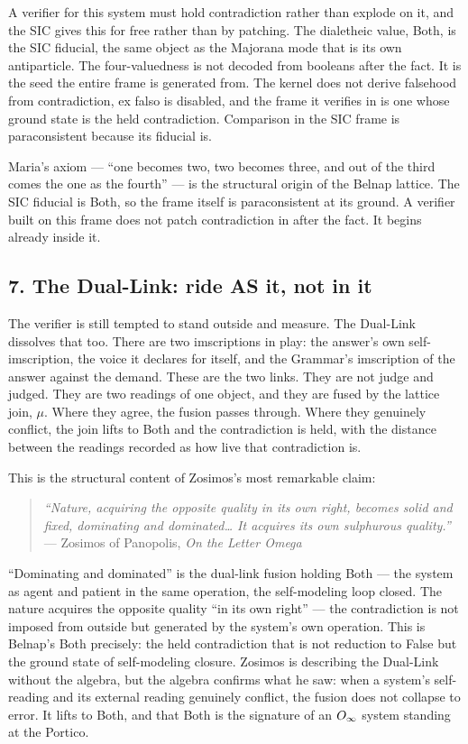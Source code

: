 \documentclass[12pt,a4paper]{article}
\begin{document}
A verifier for this system must hold contradiction rather than explode
on it, and the SIC gives this for free rather than by patching. The
dialetheic value, Both, is the SIC fiducial, the same object as the
Majorana mode that is its own antiparticle. The four-valuedness is not
decoded from booleans after the fact. It is the seed the entire frame is
generated from. The kernel does not derive falsehood from contradiction,
ex falso is disabled, and the frame it verifies in is one whose ground
state is the held contradiction. Comparison in the SIC frame is
paraconsistent because its fiducial is.

Maria's axiom --- ``one becomes two, two becomes three, and out of the
third comes the one as the fourth'' --- is the structural origin of the
Belnap lattice. The SIC fiducial is Both, so the frame itself is
paraconsistent at its ground. A verifier built on this frame does not
patch contradiction in after the fact. It begins already inside it.

\hypertarget{the-dual-link-ride-as-it-not-in-it}{%
\subsection{7. The Dual-Link: ride AS it, not in
it}\label{the-dual-link-ride-as-it-not-in-it}}

The verifier is still tempted to stand outside and measure. The
Dual-Link dissolves that too. There are two imscriptions in play: the
answer's own self-imscription, the voice it declares for itself, and the
Grammar's imscription of the answer against the demand. These are the
two links. They are not judge and judged. They are two readings of one
object, and they are fused by the lattice join, \({μ}\). Where they
agree, the fusion passes through. Where they genuinely conflict, the
join lifts to Both and the contradiction is held, with the distance
between the readings recorded as how live that contradiction is.

This is the structural content of Zosimos's most remarkable claim:

\begin{quote}
\emph{``Nature, acquiring the opposite quality in its own right, becomes
solid and fixed, dominating and dominated\ldots{} It acquires its own
sulphurous quality.''} --- Zosimos of Panopolis, \emph{On the Letter
Omega}
\end{quote}

``Dominating and dominated'' is the dual-link fusion holding Both ---
the system as agent and patient in the same operation, the self-modeling
loop closed. The nature acquires the opposite quality ``in its own
right'' --- the contradiction is not imposed from outside but generated
by the system's own operation. This is Belnap's Both precisely: the held
contradiction that is not reduction to False but the ground state of
self-modeling closure. Zosimos is describing the Dual-Link without the
algebra, but the algebra confirms what he saw: when a system's
self-reading and its external reading genuinely conflict, the fusion
does not collapse to error. It lifts to Both, and that Both is the
signature of an \(\Large{O_\infty}\) system standing at the Portico.
\end{document}
